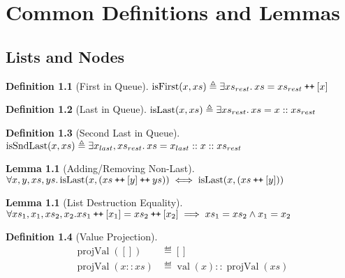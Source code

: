 \documentclass[a4paper, 10pt]{report}
\theoremstyle{definition}
\newtheorem{lemma}[theorem]{Lemma}
\newtheorem{definition}{Definition}[section]
\newcommand{\projval}{\operatorname{projVal}}
\newcommand{\isFirst}{\operatorname{isFirst}}
\newcommand{\isLast}{\operatorname{isLast}}
\newcommand{\isSndLast}{\operatorname{isSndLast}}
\newcommand{\nVal}[1]{\operatorname{val}(#1)}
\newcommand\catenate{\mathbin{\text{\ttfamily\upshape ++}}}
\begin{document}

\cleardoublepage
{}




\cleardoublepage
\appendix
\chapter{Common Definitions and Lemmas}\label{ch:appendix:common}

\section{Lists and Nodes}\label{appendix:common:section:ListsNodes}

\begin{definition}[First in Queue]\label{COMMON:Def:first-q}
  $\isFirst(x, xs) \eqdef \Exists xs_{rest} . xs = xs_{rest} \catenate [x]$
\end{definition}

\begin{definition}[Last in Queue]\label{COMMON:Def:last-q}
  $\isLast(x, xs) \eqdef \Exists xs_{rest} . xs = x :: xs_{rest}$
\end{definition}

\begin{definition}[Second Last in Queue]\label{COMMON:Def:sndlast-q}
  $\isSndLast(x, xs) \eqdef \Exists x_{last}, xs_{rest} . xs = x_{last} :: x :: xs_{rest}$
\end{definition}

\begin{lemma}[Adding/Removing Non-Last]\label{lemma:isLast-remove}
  $\All x, y, xs, ys.\\
  \isLast(x, (xs \catenate [y] \catenate ys)) \iff \isLast(x, (xs \catenate [y]))$
\end{lemma}

\begin{lemma}[List Destruction Equality]\label{lemma:list-last-eq}
  $\All xs_1, x_1, xs_2, x_2.\\
  xs_1 \catenate [x_1] = xs_2 \catenate [x_2] \implies xs_1 = xs_2 \land{} x_1 = x_2$
\end{lemma}

\begin{definition}[Value Projection]\label{COMMON:Def:val-proj}
  \begin{align*}
    \projval([]) &\eqdef []\\
    \projval(x :: xs) &\eqdef \nVal{x} :: \projval(xs)
  \end{align*}
\end{definition}
\end{document}
